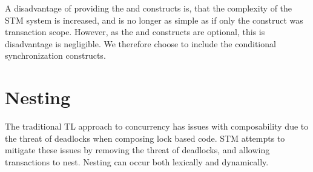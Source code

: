 A disadvantage of providing the  and  constructs is, that the complexity of the \ac{STM} system is increased, and is no longer as simple as if only the construct was  transaction scope. However, as the  and  constructs are optional, this is disadvantage is negligible. We therefore choose to include the conditional synchronization constructs.

\section{Nesting}
\label{sec:stm_req_nesting}
The traditional \acl{TL} approach to concurrency has issues with composability due to the threat of deadlocks when composing lock based code\cite[p. 58]{sutter2005software}. \ac{STM} attempts to mitigate these issues by removing the threat of deadlocks, and allowing transactions to nest. Nesting can occur both lexically and dynamically\cite[p. 1]{kumar2011hparstm}\cite[p. 42]{harris2010transactional}\cite[p. 2081]{herlihy2011tm}. 

%
%
%       
%
%
%       

